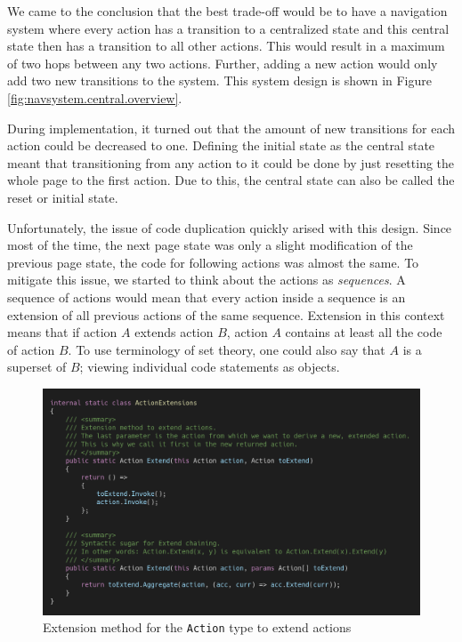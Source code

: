 We came to the conclusion that the best trade-off would be to have a navigation system where every action has a transition to a centralized state and this central state then has a transition to all other actions. This would result in a maximum of two hops between any two actions. Further, adding a new action would only add two new transitions to the system. This system design is shown in Figure \ref{fig:navsystem.central.overview}.

During implementation, it turned out that the amount of new transitions for each action could be decreased to one. Defining the initial state as the central state meant that transitioning from any action to it could be done by just resetting the whole page to the first action. Due to this, the central state can also be called the reset or initial state.

Unfortunately, the issue of code duplication quickly arised with this design. Since most of the time, the next page state was only a slight modification of the previous page state, the code for following actions was almost the same. To mitigate this issue, we started to think about the actions as \textit{sequences}. A sequence of actions would mean that every action inside a sequence is an extension of all previous actions of the same sequence. Extension in this context means that if action $A$ extends action $B$, action $A$ contains at least all the code of action $B$. To use terminology of set theory, one could also say that $A$ is a superset of $B$; viewing individual code statements as objects.

\begin{figure}
\centering
\includegraphics[width=\textwidth]{figures/code/nav-arch/action-extensions.png}
\caption[Extending \texttt{Action} type]{Extension method for the \texttt{Action} type to extend actions}
\label{fig:navsystem.sequences.extension}
\end{figure}

